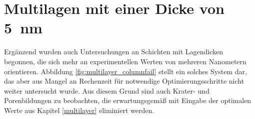 \section{Multilagen mit einer Dicke von \SI{5}{\nano\meter}}

Ergänzend wurden auch Untersuchungen an Schichten mit Lagendicken begonnen, die sich mehr an experimentellen Werten von mehreren Nanometern orientieren.
Abbildung \ref{fig:multilayer_columnfail} stellt ein solches System dar, das aber aus Mangel an Rechenzeit für notwendige Optimierungsschritte nicht weiter untersucht wurde.
Aus diesem Grund sind auch Krater- und Porenbildungen zu beobachten, die erwartungsgemäß mit Eingabe der optimalen Werte aus Kapitel \ref{multilayer} eliminiert werden.

